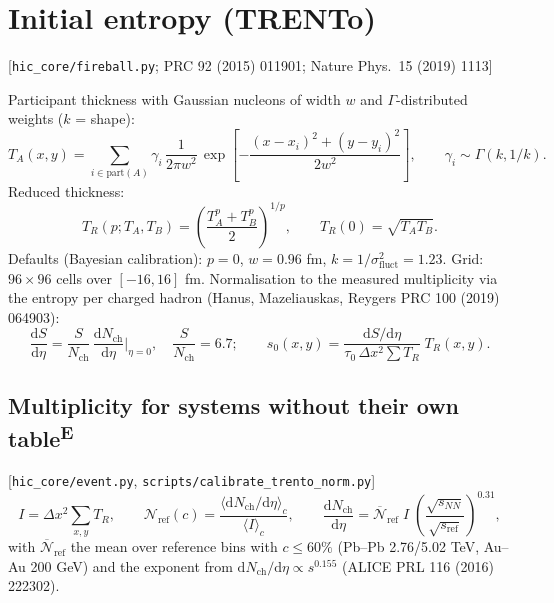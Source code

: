 \documentclass[11pt,a4paper]{article}
\newcommand{\file}[1]{\texttt{\small #1}}
\newcommand{\src}[1]{\hfill{\small\color{gray}[#1]}}
\newcommand{\emp}{\textsuperscript{\color{orange!80!black}\textbf{E}}}
\begin{document}
\section{Initial entropy (TRENTo)}
\src{\file{hic\_core/fireball.py}; PRC 92 (2015) 011901; Nature Phys.\ 15 (2019) 1113}

Participant thickness with Gaussian nucleons of width $w$ and $\Gamma$-distributed weights ($k$ = shape):
\begin{equation}
T_{A}(x,y) = \sum_{i\in\text{part}(A)} \gamma_i\,\frac{1}{2\pi w^2}\,
\exp\!\left[-\frac{(x-x_i)^2+(y-y_i)^2}{2w^2}\right],\qquad \gamma_i\sim\Gamma(k,1/k).
\end{equation}
Reduced thickness:
\begin{equation}
T_R(p;T_A,T_B) = \left(\frac{T_A^p+T_B^p}{2}\right)^{1/p},\qquad T_R(0) = \sqrt{T_AT_B}.
\end{equation}
Defaults (Bayesian calibration): $p=0$, $w=0.96$ fm, $k=1/\sigma_\text{fluct}^2 = 1.23$. Grid: $96\times96$ cells over
$[-16,16]$ fm.
Normalisation to the measured multiplicity via the entropy per charged hadron
(Hanus, Mazeliauskas, Reygers PRC 100 (2019) 064903):
\begin{equation}
\frac{\mathrm dS}{\mathrm d\eta} = \frac{S}{N_\text{ch}}\,\frac{\mathrm dN_\text{ch}}{\mathrm d\eta}\Big|_{\eta=0},
\quad \frac{S}{N_\text{ch}} = 6.7;\qquad
s_0(x,y) = \frac{\mathrm dS/\mathrm d\eta}{\tau_0\,\Delta x^2\sum T_R}\;T_R(x,y).
\end{equation}

\subsection{Multiplicity for systems without their own table\emp}
\src{\file{hic\_core/event.py}, \file{scripts/calibrate\_trento\_norm.py}}
\begin{equation}
I = \Delta x^2\sum_{x,y} T_R,\qquad
\mathcal N_\text{ref}(c) = \frac{\langle \mathrm dN_\text{ch}/\mathrm d\eta\rangle_c}{\langle I\rangle_c},\qquad
\frac{\mathrm dN_\text{ch}}{\mathrm d\eta} = \overline{\mathcal N}_\text{ref}\; I\;
\left(\frac{\sqrt{s_{NN}}}{\sqrt{s_\text{ref}}}\right)^{0.31},
\end{equation}
with $\overline{\mathcal N}_\text{ref}$ the mean over reference bins with $c\le60\%$ (Pb--Pb 2.76/5.02 TeV, Au--Au 200 GeV)
and the exponent from $\mathrm dN_\text{ch}/\mathrm d\eta\propto s^{0.155}$ (ALICE PRL 116 (2016) 222302).
\end{document}
